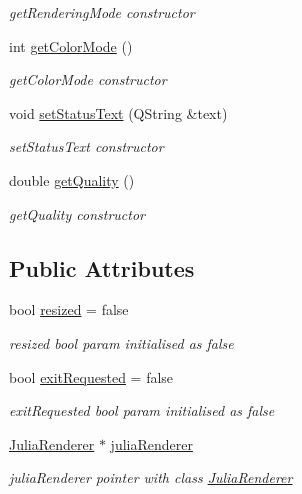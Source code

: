 \begin{DoxyCompactItemize}
\begin{DoxyCompactList}\small\item\em get\+Rendering\+Mode constructor \end{DoxyCompactList}\item 
int \hyperlink{classMainWindow_ab882730b5ab7e570b52cddf7134a9e63}{get\+Color\+Mode} ()
\begin{DoxyCompactList}\small\item\em get\+Color\+Mode constructor \end{DoxyCompactList}\item 
void \hyperlink{classMainWindow_aadb538c3401816b2c6038696ca0f8628}{set\+Status\+Text} (Q\+String \&text)
\begin{DoxyCompactList}\small\item\em set\+Status\+Text constructor \end{DoxyCompactList}\item 
double \hyperlink{classMainWindow_a43d3aa3fbe5ea12500ad8933534a1424}{get\+Quality} ()
\begin{DoxyCompactList}\small\item\em get\+Quality constructor \end{DoxyCompactList}\end{DoxyCompactItemize}
\subsection*{Public Attributes}
\begin{DoxyCompactItemize}
\item 
\mbox{\label{classMainWindow_a5b02344e17f89741b0ae69cdf9e9fcd2}} 
bool \hyperlink{classMainWindow_a5b02344e17f89741b0ae69cdf9e9fcd2}{resized} = false
\begin{DoxyCompactList}\small\item\em resized bool param initialised as false \end{DoxyCompactList}\item 
\mbox{\label{classMainWindow_a089b453e1c44d35636f0b6f9d13605e3}} 
bool \hyperlink{classMainWindow_a089b453e1c44d35636f0b6f9d13605e3}{exit\+Requested} = false
\begin{DoxyCompactList}\small\item\em exit\+Requested bool param initialised as false \end{DoxyCompactList}\item 
\mbox{\label{classMainWindow_ac2778f4adcf69a9a707ff1ba88ece3f6}} 
\hyperlink{classJuliaRenderer}{Julia\+Renderer} $\ast$ \hyperlink{classMainWindow_ac2778f4adcf69a9a707ff1ba88ece3f6}{julia\+Renderer}
\begin{DoxyCompactList}\small\item\em julia\+Renderer pointer with class \hyperlink{classJuliaRenderer}{Julia\+Renderer} \end{DoxyCompactList}\end{DoxyCompactItemize}
